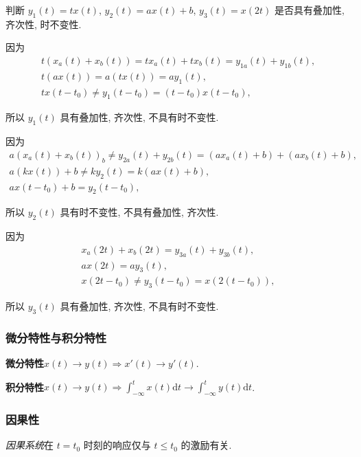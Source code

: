 \begin{exampleprob}
    判断 $y_1(t)=tx(t)$, $y_2(t)=ax(t)+b$, $y_3(t)=x(2t)$ 是否具有叠加性, 齐次性, 时不变性.

    \begin{solution}
        因为
        \srmg
        \begin{gather*}
            t(x_a(t)+x_b(t))=tx_a(t)+tx_b(t)=y_{1a}(t)+y_{1b}(t), \\
            t(ax(t))=a(tx(t))=ay_1(t), \\
            tx(t-t_0)\neq y_1(t-t_0)=(t-t_0)x(t-t_0),
        \end{gather*}

        所以 $y_1(t)$ 具有叠加性, 齐次性, 不具有时不变性.

        因为
        \srmg
        \begin{gather*}
            a(x_a(t)+x_b(t))_b\neq y_{2a}(t)+y_{2b}(t)=(ax_a(t)+b)+(ax_b(t)+b), \\
            a(kx(t))+b\neq ky_2(t)=k(ax(t)+b), \\
            ax(t-t_0)+b=y_2(t-t_0),
        \end{gather*}

        所以 $y_2(t)$ 具有时不变性, 不具有叠加性, 齐次性.

        因为
        \srmg
        \begin{gather*}
            x_a(2t)+x_b(2t)=y_{3a}(t)+y_{3b}(t), \\
            ax(2t)=ay_3(t), \\
            x(2t-t_0)\neq y_3(t-t_0)=x(2(t-t_0)),
        \end{gather*}

        所以 $y_3(t)$ 具有叠加性, 齐次性, 不具有时不变性.
    \end{solution}
\end{exampleprob}

\subsubsection{微分特性与积分特性}

\textbf{微分特性}\quad $x(t)\rightarrow y(t)\Rightarrow x'(t)\rightarrow y'(t)$.

\textbf{积分特性}\quad $x(t)\rightarrow y(t)\Rightarrow \displaystyle\int_{-\infty}^{t}x(t)\mathrm{d}t\rightarrow\int_{-\infty}^{t}y(t)\mathrm{d}t$.

\subsubsection{因果性}

\textit{因果系统}在 $t=t_0$ 时刻的响应仅与 $t\leq t_0$ 的激励有关.
